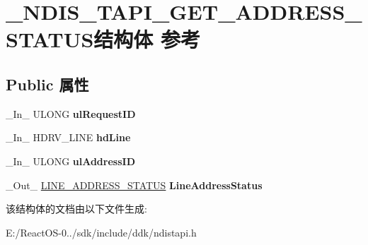 \hypertarget{struct___n_d_i_s___t_a_p_i___g_e_t___a_d_d_r_e_s_s___s_t_a_t_u_s}{}\section{\+\_\+\+N\+D\+I\+S\+\_\+\+T\+A\+P\+I\+\_\+\+G\+E\+T\+\_\+\+A\+D\+D\+R\+E\+S\+S\+\_\+\+S\+T\+A\+T\+U\+S结构体 参考}
\label{struct___n_d_i_s___t_a_p_i___g_e_t___a_d_d_r_e_s_s___s_t_a_t_u_s}
\subsection*{Public 属性}
\begin{DoxyCompactItemize}
\item 
\mbox{\label{struct___n_d_i_s___t_a_p_i___g_e_t___a_d_d_r_e_s_s___s_t_a_t_u_s_aef50bd18880e7b74d42bcd9c6d14d545}} 
\+\_\+\+In\+\_\+ U\+L\+O\+NG {\bfseries ul\+Request\+ID}
\item 
\mbox{\label{struct___n_d_i_s___t_a_p_i___g_e_t___a_d_d_r_e_s_s___s_t_a_t_u_s_ad6fb2b2632e0d3aba81935317ea9d0ea}} 
\+\_\+\+In\+\_\+ H\+D\+R\+V\+\_\+\+L\+I\+NE {\bfseries hd\+Line}
\item 
\mbox{\label{struct___n_d_i_s___t_a_p_i___g_e_t___a_d_d_r_e_s_s___s_t_a_t_u_s_aa5fd866b1bb22943914e9a3d0cd5f6f4}} 
\+\_\+\+In\+\_\+ U\+L\+O\+NG {\bfseries ul\+Address\+ID}
\item 
\mbox{\label{struct___n_d_i_s___t_a_p_i___g_e_t___a_d_d_r_e_s_s___s_t_a_t_u_s_ab2f627c595e8d9f7ccda707503a35a93}} 
\+\_\+\+Out\+\_\+ \hyperlink{struct___l_i_n_e___a_d_d_r_e_s_s___s_t_a_t_u_s}{L\+I\+N\+E\+\_\+\+A\+D\+D\+R\+E\+S\+S\+\_\+\+S\+T\+A\+T\+US} {\bfseries Line\+Address\+Status}
\end{DoxyCompactItemize}


该结构体的文档由以下文件生成\+:\begin{DoxyCompactItemize}
\item 
E\+:/\+React\+O\+S-\/0../sdk/include/ddk/ndistapi.\+h\end{DoxyCompactItemize}
